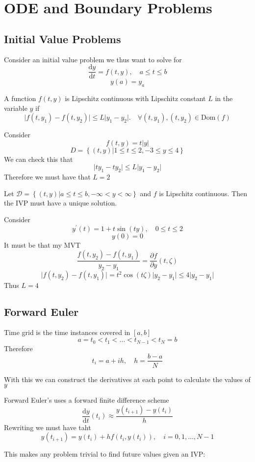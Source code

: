 \chapter{ODE and Boundary Problems}
\section{Initial Value Problems}
Consider an initial value problem we thus want to solve for 
\[
    \frac{\mathrm{d}y}{\mathrm{d}t} = f(t,y) , \quad a \leq  t \leq  b
\]
\[
    y(a) = y_a
\]
\begin{definition}
    A function \(f(t,y)\) is Lipschitz continuous with Lipschitz constant \(L\) 
    in the variable \(y\)  if 
    \[
        \vert f(t,y_1) - f(t,y_2)\vert \leq  L \vert y_1 - y_2 \vert. 
        \quad \forall (t, y_1) , (t,y_2) \in \text{Dom}(f)  
    \]
\end{definition}
\begin{eg}
Consider 
\[
    f(t,y) = t \vert y \vert 
\]
\[
    D = \left\{ (t,y) | 1 \leq  t \leq  2, -3 \leq  y \leq  4 \right\} 
\]
We can check this that 
\[
    \vert ty_1 - ty_2 \vert \leq  L \vert y_1 - y_2 \vert 
\]
Therefore we must have that \( L =  2\) 
\end{eg}

\begin{theorem}
    Let \(\mathcal{D} = \left\{ (t,y) | a \leq  t \leq  b , - \infty  < y < \infty  \right\}
     \) and \(f\) is Lipschitz continuous. Then the IVP must have a unique solution. 
\end{theorem}
\begin{eg}
Consider 
\[
    y^{\prime} (t) = 1 + t \sin  (ty), \quad 0 \leq  t \leq  2
\]
\[
    y(0) = 0
\]
It must be that my MVT
\[
    \frac{f(t, y_2) - f(t, y_1)}{y_2 - y_1 } = \frac{\partial f}{\partial y} (t, \zeta)
\]
\[
    \vert f(t,y_2) - f(t,y_1) \vert = t^{2}  \cos (t \zeta) \vert y_2 - y_1 \vert \leq  4 \vert y_2 - y_1 \vert 
\]
Thus \(L = 4\) 
\end{eg}
\section{Forward Euler}
\begin{definition}
    Time grid is the time instances covered in \(\left[ a,b \right] \)
    \[
        a = t_0 < t_1 < \dots  < t_{N-1} < t_N = b 
    \] 
    Therefore 
    \[
        t_i = a + ih, \quad h = \frac{b-a}{N}
    \]
\end{definition}
With this we can construct the derivatives at each point to calculate the values of \(y\) 
\begin{definition}
    Forward Euler's uses a forward finite difference scheme
    \[
        \frac{\mathrm{d}y}{\mathrm{d}t} (t_i) \approx \frac{y(t_{i+1} ) - y(t_i)}{h}
    \]
    Rewriting we must have taht 
    \[
        y(t_{i+1} ) = y(t_i) + h f(t_i, y(t_i)), \quad i = 0,1, \dots , N-1
    \]
\end{definition}
This makes any problem trivial to find future values given an IVP:



